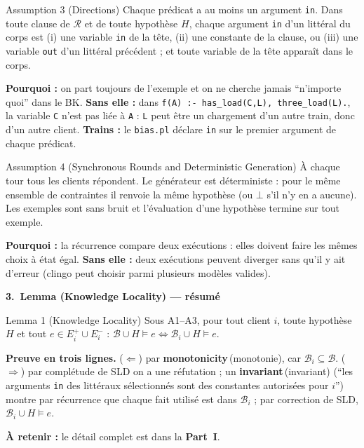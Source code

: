 \documentclass[10pt]{article}
\newcommand{\EN}[2]{\textbf{#1}\,{\scriptsize\textcolor{marine}{(#2)}}}
\newcommand{\titrebox}[2]{\needspace{10\baselineskip}\vspace{8pt}
  \begin{tcolorbox}[colback=marine, colframe=marine, arc=0pt, boxrule=0pt,
    top=4pt, bottom=4pt, left=8pt]
  \color{white}\Large\bfseries #1.~#2
  \end{tcolorbox}\vspace{2pt}}
\newcommand{\ce}[1]{\begin{pourquoi}\textbf{\textcolor{marine}{À retenir :}} #1\end{pourquoi}}
\newcommand{\st}[1]{\par\needspace{7\baselineskip}\vspace{5pt}{\normalsize\bfseries\textcolor{marine}{#1}}\par\vspace{2pt}}
\begin{document}
\st{Assumption 3 --- Directions}
\begin{enonce}{Assumption 3 (Directions)}
Chaque prédicat a au moins un argument \texttt{in}. Dans toute clause de $\mathcal{R}$ et de toute hypothèse $H$, chaque argument \texttt{in}
d'un littéral du corps est (i) une variable \texttt{in} de la tête, (ii) une constante de la clause, ou (iii) une variable \texttt{out} d'un
littéral précédent ; et toute variable de la tête apparaît dans le corps.
\end{enonce}
\textbf{Pourquoi :} on part toujours de l'exemple et on ne cherche jamais ``n'importe quoi'' dans le BK.
\textbf{Sans elle :} dans \texttt{f(A) :- has\_load(C,L), three\_load(L).}, la variable \texttt{C} n'est pas liée à \texttt{A} : \texttt{L} peut être un chargement d'un autre train, donc d'un autre client.
\textbf{Trains :} le \texttt{bias.pl} déclare \texttt{in} sur le premier argument de chaque prédicat.

\st{Assumption 4 --- Synchronous Rounds and Deterministic Generation}
\begin{enonce}{Assumption 4 (Synchronous Rounds and Deterministic Generation)}
À chaque tour tous les clients répondent. Le générateur est déterministe : pour le même ensemble de contraintes il renvoie la même hypothèse
(ou $\bot$ s'il n'y en a aucune). Les exemples sont sans bruit et l'évaluation d'une hypothèse termine sur tout exemple.
\end{enonce}
\textbf{Pourquoi :} la récurrence compare deux exécutions : elles doivent faire les mêmes choix à état égal.
\textbf{Sans elle :} deux exécutions peuvent diverger sans qu'il y ait d'erreur (clingo peut choisir parmi plusieurs modèles valides).

\titrebox{3}{Lemma (Knowledge Locality) --- résumé}
\begin{enonce}{Lemma 1 (Knowledge Locality)}
Sous A1--A3, pour tout client $i$, toute hypothèse $H$ et tout $e\in E_i^+\cup E_i^-$ :
$\mathcal{B}\cup H\models e\iff\mathcal{B}_i\cup H\models e$.
\end{enonce}
\textbf{Preuve en trois lignes.} ($\Leftarrow$) par \EN{monotonicity}{monotonie}, car $\mathcal{B}_i\subseteq\mathcal{B}$.
($\Rightarrow$) par complétude de SLD on a une réfutation ; un \EN{invariant}{invariant} (``les arguments \texttt{in} des littéraux sélectionnés sont des constantes autorisées pour $i$'')
montre par récurrence que chaque fait utilisé est dans $\mathcal{B}_i$ ; par correction de SLD, $\mathcal{B}_i\cup H\models e$.
\ce{le détail complet est dans la \textbf{Part~I}.}
\end{document}
